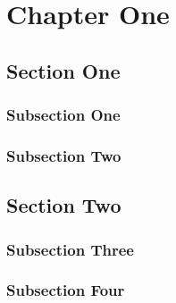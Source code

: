\chapter{Chapter One}
\lipsum[1-4]
\section{Section One}
\lipsum[5-8]
\subsection{Subsection One}
\lipsum[9-12]
\subsection{Subsection Two}
\lipsum[13-16]
\section{Section Two}
\lipsum[17-20]
\subsection{Subsection Three}
\lipsum[21-24]
\subsection{Subsection Four}
\lipsum[25-28]
